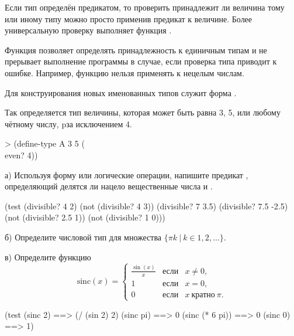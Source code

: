 Если тип определён предикатом, то проверить принадлежит ли величина тому или иному типу можно просто применив предикат к величине. Более универсальную проверку выполняет функция .

\begin{example}{%
Функция  позволяет определять принадлежность к единичным типам и не прерывает выполнение программы в случае, если проверка типа приводит к ошибке. Например, функцию  нельзя применять к нецелым числам.}
\end{example}

Для конструирования новых именованных типов служит форма .

\begin{example}{%
Так определяется тип величины, которая может быть равна 3, 5, или любому чётному числу, pза исключением 4.}
\begin{ExampleCode}
> (define-type A
    3 5 (\\ even? 4))
\end{ExampleCode}
\end{example}


\begin{Assignment}
а) Используя форму  или логические операции, напишите предикат , определяющий делятся ли нацело вещественные числа  и . 

\begin{Specification}
(test
  (divisible? 4 2)
  (not (divisible? 4 3))
  (divisible? 7 3.5)
  (divisible? 7.5 -2.5)
  (not (divisible? 2.5 1))
  (not (divisible? 1 0)))
\end{Specification}

б) Определите числовой тип для множества $\{\pi k\ |\ k \in 1,2, ...\}$.

в) Определите функцию 
\begin{equation*}
\mathrm{sinc}(x) = \left\{
\begin{array}{lll}
  \frac{\sin(x)}{x} &\text{если}& x \neq 0,\\
  1 &\text{если}& x = 0,\\
  0 &\text{если}& x~\text{кратно}~\pi.
\end{array}\right. 
\end{equation*}
 
\begin{Specification}
(test
  (sinc 2)        ==> (/ (sin 2) 2)
  (sinc pi)       ==> 0
  (sinc (* 6 pi)) ==> 0
  (sinc 0)        ==> 1)
\end{Specification}
\end{Assignment}



